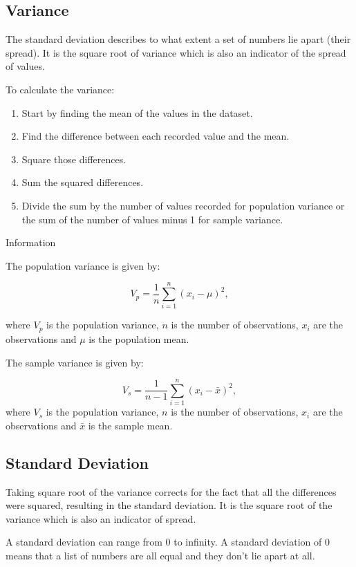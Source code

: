 \documentclass[
]{book}
\providecommand{\tightlist}{%
  \setlength{\itemsep}{0pt}\setlength{\parskip}{0pt}}
\begin{document}
\hypertarget{varr}{%
\subsection{Variance}\label{varr}}

The standard deviation describes to what extent a set of numbers lie apart (their spread). It is the square root of variance which is also an indicator of the spread of values.

To calculate the variance:

\begin{enumerate}
\def\labelenumi{\arabic{enumi}.}
\tightlist
\item
  Start by finding the mean of the values in the dataset.
\item
  Find the difference between each recorded value and the mean.
\item
  Square those differences.
\item
  Sum the squared differences.
\item
  Divide the sum by the number of values recorded for population variance or the sum of the number of values minus 1 for sample variance.
\end{enumerate}

Information

The population variance is given by:

\[V_{p} = \frac{1}{n}\sum_{i=1}^n (x_i - \mu)^2,\]

where \(V_p\) is the population variance, \(n\) is the number of observations, \(x_i\) are the observations and \(\mu\) is the population mean.

The sample variance is given by:

\[V_{s} = \frac{1}{n-1}\sum_{i=1}^n (x_i - \bar{x})^2,\]
where \(V_s\) is the population variance, \(n\) is the number of observations, \(x_i\) are the observations and \(\bar{x}\) is the sample mean.

\hypertarget{stdv}{%
\subsection{Standard Deviation}\label{stdv}}

Taking square root of the variance corrects for the fact that all the differences were squared, resulting in the standard deviation. It is the square root of the variance which is also an indicator of spread.

A standard deviation can range from 0 to infinity. A standard deviation of 0 means that a list of numbers are all equal and they don't lie apart at all.
\end{document}

